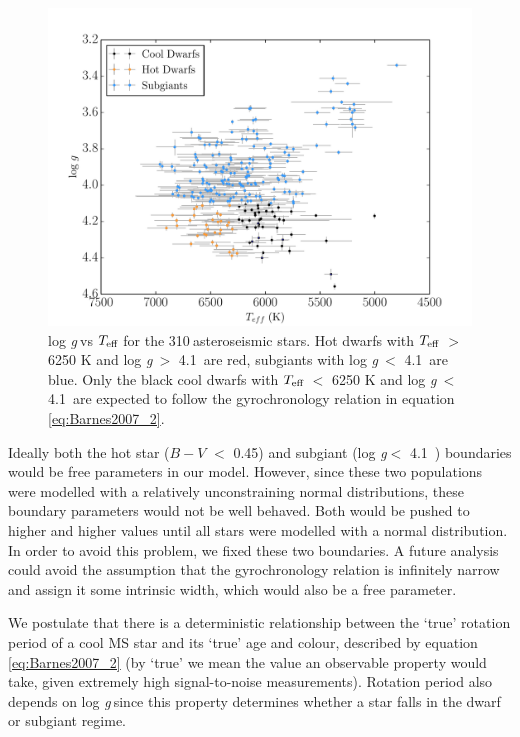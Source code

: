 \documentclass[useAMS, usenatbib]{mn2e}
\newcommand{\logg}{log \emph{g}}
\newcommand{\teff}{$T_{\rm{eff}}$}
\newcommand{\nastero}{310}
\newcommand{\subcut}{4.1~}
\begin{document}
\begin{figure}
\begin{center}
\includegraphics[width=6in, clip=true, trim=0 0 0.5in 0]{logg_vs_t_paper.pdf}
\caption{\logg$~$vs \teff$~$for the \nastero$~$asteroseismic stars. Hot dwarfs
with \teff$~>$ 6250 K and \logg$~>$ \subcut are red, subgiants with \logg$~<$
\subcut are blue. Only the black cool dwarfs with \teff$~<$ 6250 K and
\logg$~<$ \subcut are expected to follow the gyrochronology relation in
equation \ref{eq:Barnes2007_2}.
\label{fig:logg_vs_t}}
\end{center}
\end{figure}

Ideally both the hot star ($B-V$ $<$ 0.45) and subgiant (\logg $<$ \subcut)
boundaries would be free parameters in our model.
However, since these two populations were modelled with a relatively
unconstraining normal distributions, these boundary parameters would not be
well behaved.
Both would be pushed to higher and higher values until all stars were modelled
with a normal distribution.
In order to avoid this problem, we fixed these two boundaries.
A future analysis could avoid the assumption that the gyrochronology relation
is infinitely narrow and assign it some intrinsic width, which would also be
a free parameter.

We postulate that there is a deterministic relationship between the `true'
rotation period of a cool MS star and its `true' age and colour, described by
equation \ref{eq:Barnes2007_2} (by `true' we mean the value an observable
property would take, given extremely high signal-to-noise measurements).
Rotation period also depends on \logg$~$since this property determines whether
a star falls in the dwarf or subgiant regime.
\end{document}
